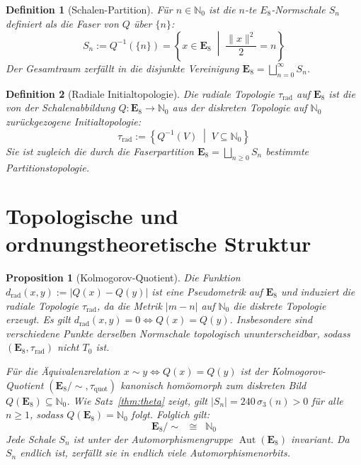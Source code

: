 \documentclass[11pt,a4paper]{article}
\newtheorem{definition}{Definition}
\newtheorem{proposition}{Proposition}
\begin{document}
	\begin{definition}[Schalen-Partition]
		Für $n \in \mathbb{N}_0$ ist die $n$-te $E_8$-Normschale $S_n$ definiert als die Faser von $Q$ über $\{n\}$:
		$$S_n := Q^{-1}(\{n\}) = \left\{ x \in \mathbf{E}_8 \;\middle|\; \frac{\|x\|^2}{2} = n \right\}$$
		Der Gesamtraum zerfällt in die disjunkte Vereinigung $\mathbf{E}_8 = \bigsqcup_{n=0}^{\infty} S_n$.
	\end{definition}
	
	\begin{definition}[Radiale Initialtopologie]
		Die radiale Topologie $\tau_{\text{rad}}$ auf $\mathbf{E}_8$ ist die von der Schalenabbildung $Q: \mathbf{E}_8 \to \mathbb{N}_0$ aus der diskreten Topologie auf $\mathbb{N}_0$ zurückgezogene Initialtopologie:
		$$\tau_{\text{rad}} := \left\{ Q^{-1}(V) \;\middle|\; V \subseteq \mathbb{N}_0 \right\}$$
		Sie ist zugleich die durch die Faserpartition $\mathbf{E}_8 = \bigsqcup_{n \ge 0} S_n$ bestimmte Partitionstopologie.
	\end{definition}
	
	\section{Topologische und ordnungstheoretische Struktur}
	
	\begin{proposition}[Kolmogorov-Quotient]
		Die Funktion $d_{\text{rad}}(x,y) := |Q(x) - Q(y)|$ ist eine Pseudometrik auf $\mathbf{E}_8$ und induziert die radiale Topologie $\tau_{\text{rad}}$, da die Metrik $|m-n|$ auf $\mathbb{N}_0$ die diskrete Topologie erzeugt. Es gilt $d_{\text{rad}}(x,y) = 0 \iff Q(x) = Q(y)$. Insbesondere sind verschiedene Punkte derselben Normschale topologisch ununterscheidbar, sodass $(\mathbf{E}_8, \tau_{\text{rad}})$ nicht $T_0$ ist.
		
		Für die Äquivalenzrelation $x \sim y \iff Q(x) = Q(y)$ ist der Kolmogorov-Quotient $(\mathbf{E}_8 / \sim, \tau_{\text{quot}})$ kanonisch homöomorph zum diskreten Bild $Q(\mathbf{E}_8) \subseteq \mathbb{N}_0$. Wie Satz~\ref{thm:theta} zeigt, gilt $|S_n| = 240\,\sigma_3(n) > 0$ für alle $n \ge 1$, sodass $Q(\mathbf{E}_8) = \mathbb{N}_0$ folgt. Folglich gilt:
		$$\mathbf{E}_8 / \sim \;\;\cong\;\; \mathbb{N}_0$$
		Jede Schale $S_n$ ist unter der Automorphismengruppe $\operatorname{Aut}(\mathbf{E}_8)$ invariant. Da $S_n$ endlich ist, zerfällt sie in endlich viele Automorphismenorbits.
	\end{proposition}
	
\end{document}
